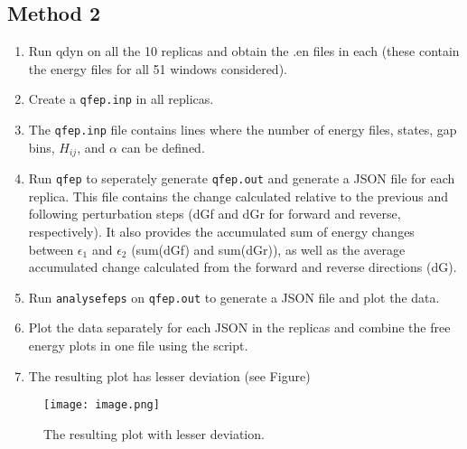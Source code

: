 \documentclass{article}
\begin{document}
\subsection{Method 2}

\begin{enumerate}
    \item Run qdyn on all the 10 replicas and obtain the .en files in each (these contain the energy files for all 51 windows considered).
    \item Create a \texttt{qfep.inp} in all replicas.
     \item The \texttt{qfep.inp} file contains lines where the number of energy files, states, gap bins, \(H_{ij}\), and \(\alpha\) can be defined.
    \item Run \texttt{qfep} to seperately generate \texttt{qfep.out} and generate a JSON file for each replica.
    This file contains the change calculated relative to the previous and following perturbation steps (dGf and dGr for forward and reverse, respectively). It also provides the accumulated sum of energy changes between \(\epsilon_1\) and \(\epsilon_2\) (sum(dGf) and sum(dGr)), as well as the average accumulated change calculated from the forward and reverse directions (dG).
    \item Run \texttt{analysefeps} on \texttt{qfep.out} to generate a JSON file and plot the data.
    \item Plot the data separately for each JSON in the replicas and combine the free energy plots in one file using the script.
    \item The resulting plot has lesser deviation (see Figure)
\end{enumerate}

\begin{figure}[h] %
    \centering
    \texttt{[image: image.png]} %
    \caption{The resulting plot with lesser deviation.}
    \label{fig:noise}
\end{figure}
\end{document}
